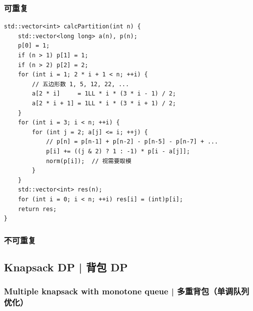 
    \subsubsection{可重复}


        \begin{lstlisting}
std::vector<int> calcPartition(int n) {
    std::vector<long long> a(n), p(n);
    p[0] = 1;
    if (n > 1) p[1] = 1;
    if (n > 2) p[2] = 2;
    for (int i = 1; 2 * i + 1 < n; ++i) {
        // 五边形数 1, 5, 12, 22, ...
        a[2 * i]     = 1LL * i * (3 * i - 1) / 2;
        a[2 * i + 1] = 1LL * i * (3 * i + 1) / 2;
    }
    for (int i = 3; i < n; ++i) {
        for (int j = 2; a[j] <= i; ++j) {
            // p[n] = p[n-1] + p[n-2] - p[n-5] - p[n-7] + ...
            p[i] += ((j & 2) ? 1 : -1) * p[i - a[j]];
            norm(p[i]);  // 视需要取模
        }
    }
    std::vector<int> res(n);
    for (int i = 0; i < n; ++i) res[i] = (int)p[i];
    return res;
}
        \end{lstlisting}

    \subsubsection{不可重复}

\subsection{Knapsack DP | 背包 DP}

    \subsubsection{Multiple knapsack with monotone queue | 多重背包（单调队列优化）}

